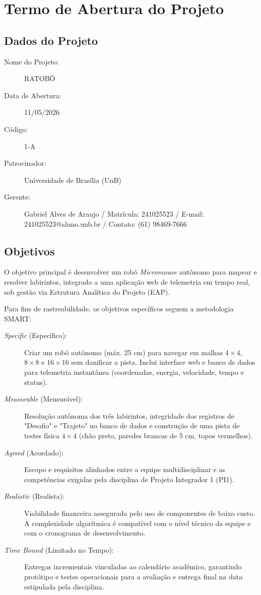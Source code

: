\chapter[Termo de Abertura do Projeto]{Termo de Abertura do Projeto}
\vspace{-1cm}

\section{Dados do Projeto}
\begin{description}
    \item [Nome do Projeto:] RATOBÔ
    \item [Data de Abertura:] 11/05/2026
    \item [Código:] 1-A
    \item [Patrocinador:] Universidade de Brasília (UnB)
    \item [Gerente:] Gabriel Alves de Araujo / Matrícula: 241025523 / E-mail: 241025523@aluno.unb.br / Contato: (61) 98469-7666
\end{description}

\section{Objetivos}
O objetivo principal é desenvolver um robô \textit{Micromouse} autônomo para mapear e resolver labirintos, integrado a uma aplicação web de telemetria em tempo real, sob gestão via Estrutura Analítica do Projeto (EAP).

Para fins de rastreabilidade, os objetivos específicos seguem a metodologia SMART:

\begin{description}
    \item [\textit{Specific} (Específico):] Criar um robô autônomo (máx. 25 cm) para navegar em malhas $4\times4$, $8\times8$ e $16\times16$ sem danificar a pista. Inclui interface web e banco de dados para telemetria instantânea (coordenadas, energia, velocidade, tempo e status).
    \item [\textit{Measurable} (Mensurável):] Resolução autônoma dos três labirintos, integridade dos registros de "Desafio" e "Trajeto" no banco de dados e construção de uma pista de testes física $4\times4$ (chão preto, paredes brancas de 5 cm, topos vermelhos).
    \item [\textit{Agreed} (Acordado):] Escopo e requisitos alinhados entre a equipe multidisciplinar e as competências exigidas pela disciplina de Projeto Integrador 1 (PI1).
    \item [\textit{Realistic} (Realista):] Viabilidade financeira assegurada pelo uso de componentes de baixo custo. A complexidade algorítmica é compatível com o nível técnico da equipe e com o cronograma de desenvolvimento.
    \item [\textit{Time Bound} (Limitado no Tempo):] Entregas incrementais vinculadas ao calendário acadêmico, garantindo protótipo e testes operacionais para a avaliação e entrega final na data estipulada pela disciplina.
\end{description}

